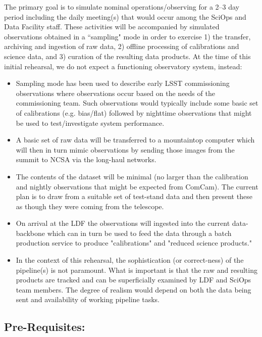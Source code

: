 The primary goal is to simulate nominal operations/observing for a 2--3 day 
period including the daily meeting(s) that would occur among the SciOps and 
Data Facility staff.  These activities will be accompanied by simulated 
observations obtained in a ``sampling" mode in order to exercise 1) the 
transfer, archiving and ingestion of raw data, 2) offline processing of 
calibrations and science data, and 3) curation of the resulting data products.
At the time of this initial rehearsal, we do not expect a functioning 
observatory system, instead:

\begin{itemize}[topsep=0pt]
\item Sampling mode has been used to describe early LSST commissioning 
observations where observations occur based on the needs of the commissioning 
team.  Such observations would typically include some basic set of calibrations
(e.g. bias/flat) followed by nighttime observations that might be used to 
test/investigate system performance.

\item A basic set of raw data will be transferred to a mountaintop computer 
which will then in turn mimic observations by sending those images from the
summit to NCSA via the long-haul networks.

\item The contents of the dataset will be minimal (no larger than the 
calibration and nightly observations that might be expected from ComCam).  
The current plan is to draw from a suitable set of test-stand data and 
then present these as though they were coming from the telescope.

\item On arrival at the LDF the observations will ingested into the current 
data-backbone which can in turn be used to feed the data through a batch 
production service to produce "calibrations" and "reduced science products."

\item In the context of this rehearsal, the sophistication (or correct-ness) 
of the pipeline(s) is not paramount.  What is important is that the raw and 
resulting products are tracked and can be superficially examined by LDF and 
SciOps team members.  The degree of realism would depend on both the data
being sent and availability of working pipeline tasks.
\end{itemize}


\clearpage
\subsection{Pre-Requisites:}

